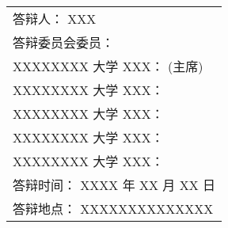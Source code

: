 \begin{titlepage}
\begin{center}
		\vspace{6cm}
		{\sanhao
			\begin{center} \renewcommand{\arraystretch}{1.5}
				\begin{tabular}{l}
					答辩人： XXX \\
					答辩委员会委员：\\
					\hspace{2em} XXXXXXXX 大学 XXX： \underline{\hspace{6em}} (主席) \\
					\hspace{2em} XXXXXXXX 大学 XXX： \underline{\hspace{6em}} \\ 
					\hspace{2em} XXXXXXXX 大学 XXX： \underline{\hspace{6em}} \\
					\hspace{2em} XXXXXXXX 大学 XXX： \underline{\hspace{6em}} \\
					\hspace{2em} XXXXXXXX 大学 XXX： \underline{\hspace{6em}} \\
					答辩时间： XXXX 年 XX 月 XX 日 \\
					答辩地点： XXXXXXXXXXXXXX \\
				\end{tabular} \renewcommand{\arraystretch}{1}
			\end{center} 
		}
	\end{center}
	\clearpage{\pagestyle{empty}\cleardoublepage}
\end{titlepage}
